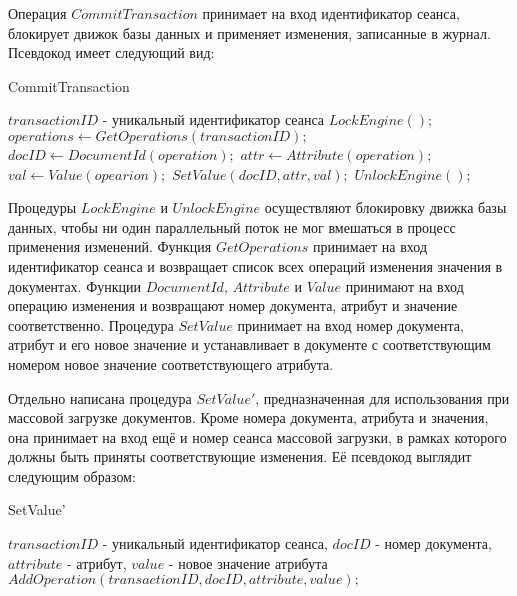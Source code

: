 \documentclass{matmex-diploma}
\begin{document}
        Операция $CommitTransaction$ принимает на вход идентификатор сеанса, блокирует движок базы данных и применяет изменения, записанные в журнал. Псевдокод имеет следующий вид:
        
        \begin{algorithm}[H]                   
        \caption{CommitTransaction}              
        \label{commitTran1}                        
            \begin{algorithmic}
                \REQUIRE $transactionID$ - уникальный идентификатор сеанса
                \STATE $LockEngine();$
                \STATE $ operations \leftarrow GetOperations(transactionID);$
                    \STATE $docID \leftarrow DocumentId(operation);$
                    \STATE $attr \leftarrow Attribute(operation);$
                    \STATE $val \leftarrow Value(opearion);$
                    \STATE $SetValue(docID, attr, val);$
                \ENDFOR
                \STATE $UnlockEngine();$
            \end{algorithmic}
        \end{algorithm}
        
        Процедуры $LockEngine$ и $UnlockEngine$ осуществляют блокировку движка базы данных, чтобы ни один параллельный поток не мог вмешаться в процесс применения изменений. Функция $GetOperations$ принимает на вход идентификатор сеанса и возвращает список всех операций изменения значения в документах. Функции $DocumentId$, $Attribute$ и $Value$ принимают на вход операцию изменения и возвращают номер документа, атрибут и значение соответственно. Процедура $SetValue$ принимает на вход номер документа, атрибут и его новое значение и устанавливает в документе с соответствующим номером новое значение соответствующего атрибута.
        
        Отдельно написана процедура $SetValue'$, предназначенная для использования при массовой загрузке документов. Кроме номера документа, атрибута и значения, она принимает на вход ещё и номер сеанса массовой загрузки, в рамках которого должны быть приняты соответствующие изменения. Её псевдокод выглядит следующим образом:
        
        \begin{algorithm}[H]                   
        \caption{SetValue'}              
        \label{update}                        
            \begin{algorithmic}
                \REQUIRE $transactionID$ - уникальный идентификатор сеанса, $docID$ - номер документа, $attribute$ - атрибут, $value$ - новое значение атрибута
                \STATE $ AddOperation(transactionID, docID, attribute, value);$
            \end{algorithmic}
        \end{algorithm}
        
\end{document}
